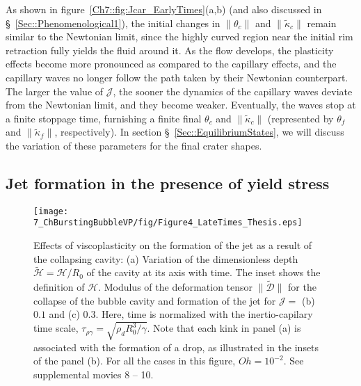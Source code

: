 As shown in figure~\ref{Ch7::fig:Jcar_EarlyTimes}(a,b) (and also discussed in \S~\ref{Sec::Phenomenological1}), the initial changes in $\|\theta_c\|$ and $\|\tilde \kappa_c\|$ remain similar to the Newtonian limit, since the highly curved region near the initial rim retraction fully yields the fluid around it. As the flow develops, the plasticity effects become more pronounced as compared to the capillary effects, and the capillary waves no longer follow the path taken by their Newtonian counterpart.
The larger the value of $\mathcal{J}$, the sooner the dynamics of the capillary waves deviate from the Newtonian limit, and they become weaker. Eventually, the waves stop at a finite stoppage time, furnishing a finite final $\theta_c$ and $\|\tilde \kappa_c\|$ (represented by $\theta_f$ and $\|\tilde \kappa_f\|$, respectively). In section \S~\ref{Sec::EquilibriumStates}, we will discuss the variation of these parameters for the final crater shapes.

\subsection{Jet formation in the presence of yield stress}\label{Sec::JetFormation}

\begin{sidewaysfigure}
	\centering
	\texttt{[image: 7\_ChBurstingBubbleVP/fig/Figure4\_LateTimes\_Thesis.eps]}
	\caption{Effects of viscoplasticity on the formation of the jet as a result of the collapsing cavity: (a) Variation of the dimensionless depth $\tilde{\mathcal{H}} = \mathcal{H}/R_0$ of the cavity at its axis with time. The inset shows the definition of $\mathcal{H}$. Modulus of the deformation tensor $\|\boldsymbol{\tilde{\mathcal{D}}}\|$ for the collapse of the bubble cavity and formation of the jet for $\mathcal{J} =$ (b) $0.1$ and (c) $0.3$. Here, time is normalized with the inertio-capilary time scale, $\tau_{\rho\gamma} = \sqrt{\rho_d R_0^3/\gamma}$. Note that each kink in panel (a) is associated with the formation of a drop, as illustrated in the insets of the panel (b). For all the cases in this figure, $Oh = 10^{-2}$. See supplemental movies {\color{Myfig} 8 -- 10}.}
	\label{Ch7::fig:Jcar_LateTimes}
\end{sidewaysfigure}

